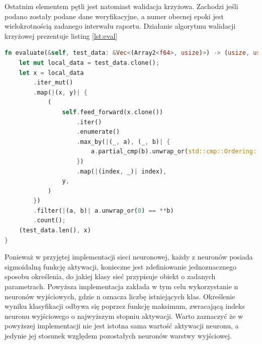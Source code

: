 \documentclass[12pt,twoside]{article}
\begin{document}
Ostatnim elementem pętli jest natomiast walidacja krzyżowa.
Zachodzi jeśli podano zostały podane dane weryfikacyjne, a numer obecnej epoki jest wielokrotnością zadanego interwału raportu.
Działanie algorytmu walidacji krzyżowej prezentuje listing \ref{lst:eval}

\begin{lstlisting}[language=Rust,caption=Realizacja funkcji walidacji krzyżowej,label={lst:eval}]
fn evaluate(&self, test_data: &Vec<(Array2<f64>, usize)>) -> (usize, usize) {
	let mut local_data = test_data.clone();
	let x = local_data
		.iter_mut()
		.map(|(x, y)| {
			(
				self.feed_forward(x.clone())
					.iter()
					.enumerate()
					.max_by(|(_, a), (_, b)| {
						a.partial_cmp(b).unwrap_or(std::cmp::Ordering::Equal)
					})
					.map(|(index, _)| index),
				y,
			)
		})
		.filter(|(a, b)| a.unwrap_or(0) == **b)
		.count();
	(test_data.len(), x)
}
\end{lstlisting}
Ponieważ w przyjętej implementacji sieci neuronowej, każdy z neuronów posiada sigmoidalną funkcję aktywacji, konieczne jest zdefiniowanie jednoznacznego sposobu określenia, do jakiej klasy sieć przypisuje obiekt o zadanych parametrach.
Powyższa implementacja zakłada w tym celu wykorzystanie n neuronów wyjściowych, gdzie n oznacza liczbę istniejących klas.
Określenie wyniku klasyfikacji odbywa się poprzez funkcję maksimum, zwracającą indeks neuronu wyjściowego o najwyższym stopniu aktywacji.
Warto zaznaczyć że w powyższej implementacji nie jest istotna sama wartość aktywacji neuronu, a jedynie jej stosunek względem pozostałych neuronów warstwy wyjściowej.
\end{document}
